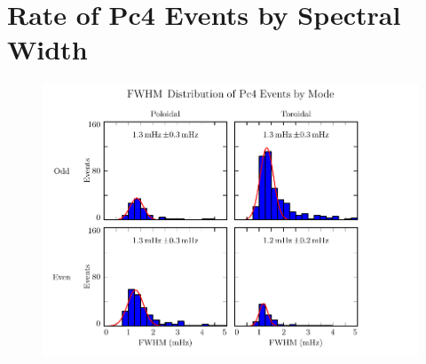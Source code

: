 \section{Rate of Pc4 Events by Spectral Width}
  \label{sec_fwhm}



\begin{figure}[!htb]
    \centering
    \includegraphics[width=\textwidth]{figures/fwhm.pdf}
    \caption[TEST FIGURE]{
      \todo{$\cdots$}
    }
    \label{fig_fwhm}
\end{figure}


